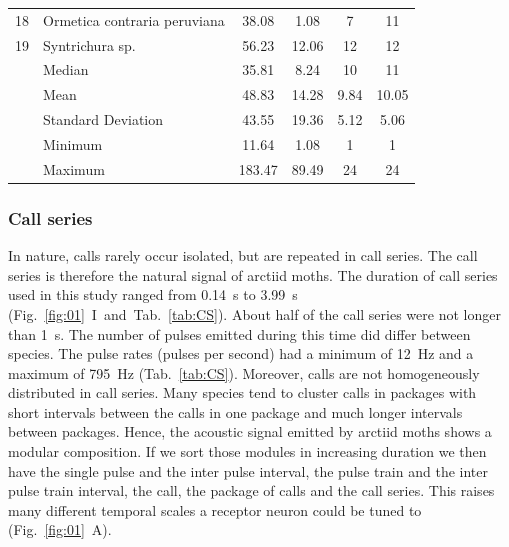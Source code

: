 \documentclass[12pt,a4paper]{article}
\newcommand{\fig}[2]{(Fig.~#1~#2)}
\begin{document}
\begin{table}[h]
\begin{tabular}{llcccc}
		18           & Ormetica contraria peruviana & 38.08                                                & 1.08                                            & 7                                                         & 11                                                         \\
		19           & Syntrichura sp.                  & 56.23                                                & 12.06                                           & 12                                                        & 
		12   \\ \hline 
		& Median & 35.81 &	8.24 &	10 &	11 \\
		& Mean & 48.83 &	14.28	& 9.84 &	10.05 \\
		& Standard Deviation & 43.55 &	19.36 &	5.12	& 5.06 \\
		& Minimum & 11.64	& 1.08 &	1	& 1 \\
		& Maximum &183.47	& 89.49	& 24 &	24
		
		
		
		                                                    
	\end{tabular}
\end{table}

\subsubsection{Call series}
In nature, calls rarely occur isolated, but are repeated in call series. The call series is therefore the natural signal of arctiid moths. The duration of call series used in this study ranged from 0.14~s to 3.99~s (Fig.~\ref{fig:01}~{I}~and~Tab.~\ref{tab:CS}). About half of the call series were not longer than 1~s. The number of pulses emitted during this time did differ between species. The pulse rates (pulses per second) had a minimum of 12~Hz and a maximum of 795~Hz (Tab.~\ref{tab:CS}). Moreover, calls are not homogeneously distributed in call series. Many species tend to cluster calls in packages with short intervals between the calls in one package and much longer intervals between packages. Hence, the acoustic signal emitted by arctiid moths shows a modular composition. If we sort those modules in increasing duration we then have the single pulse and the inter pulse interval, the pulse train and the inter pulse train interval, the call, the package of calls and the call series. This raises many different temporal scales a receptor neuron could be tuned to \fig{\ref{fig:01}}{A}. 
 
\end{document}

